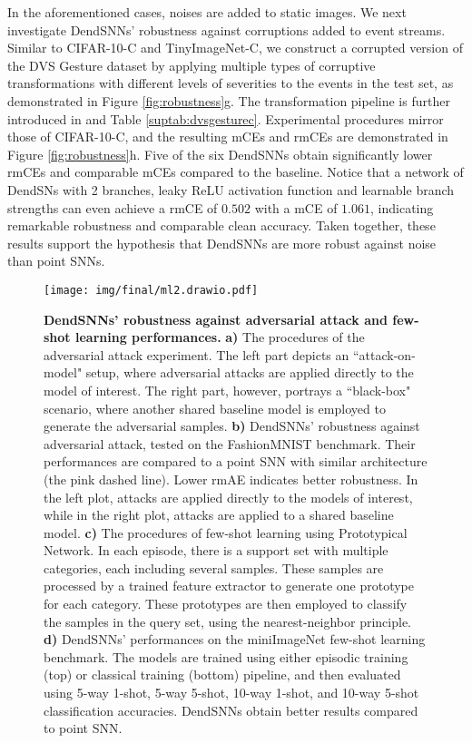 In the aforementioned cases, noises are added to static images. We next investigate DendSNNs' robustness against corruptions added to event streams. Similar to CIFAR-10-C and TinyImageNet-C, we construct a corrupted version of the DVS Gesture dataset \cite{amir2017dvsgesture} by applying multiple types of corruptive transformations with different levels of severities to the events in the test set, as demonstrated in Figure \ref{fig:robustness}g. The transformation pipeline is further introduced in  and Table \ref{suptab:dvsgesturec}. Experimental procedures mirror those of CIFAR-10-C, and the resulting mCEs and rmCEs are demonstrated in Figure \ref{fig:robustness}h. Five of the six DendSNNs obtain significantly lower rmCEs and comparable mCEs compared to the baseline. Notice that a network of DendSNs with 2 branches, leaky ReLU activation function and learnable branch strengths can even achieve a rmCE of $0.502$ with a mCE of $1.061$, indicating remarkable robustness and comparable clean accuracy. Taken together, these results support the hypothesis that DendSNNs are more robust against noise than point SNNs.

\begin{figure}[tp!]
    \centering
    \texttt{[image: img/final/ml2.drawio.pdf]}
    \caption{
        \textbf{DendSNNs' robustness against adversarial attack and few-shot learning performances.}
        \textbf{a)} The procedures of the adversarial attack experiment. The left part depicts an ``attack-on-model" setup, where adversarial attacks are applied directly to the model of interest.
        The right part, however, portrays a ``black-box" scenario, where another shared baseline model is employed to generate the adversarial samples.
        \textbf{b)} DendSNNs' robustness against adversarial attack, tested on the FashionMNIST benchmark. Their performances are compared to a point SNN with similar architecture (the pink dashed line). Lower rmAE indicates better robustness. In the left plot, attacks are applied directly to the models of interest, while in the right plot, attacks are applied to a shared baseline model.
        \textbf{c)} The procedures of few-shot learning using Prototypical Network. In each episode, there is a support set with multiple categories, each including several samples. These samples are processed by a trained feature extractor to generate one prototype for each category. These prototypes are then employed to classify the samples in the query set, using the nearest-neighbor principle.
        \textbf{d)} DendSNNs' performances on the miniImageNet few-shot learning benchmark. The models are trained using either episodic training (top) or classical training (bottom) pipeline, and then evaluated using 5-way 1-shot, 5-way 5-shot, 10-way 1-shot, and 10-way 5-shot classification accuracies. DendSNNs obtain better results compared to point SNN.
    }
    \label{fig:adv-fewshot}
\end{figure}

